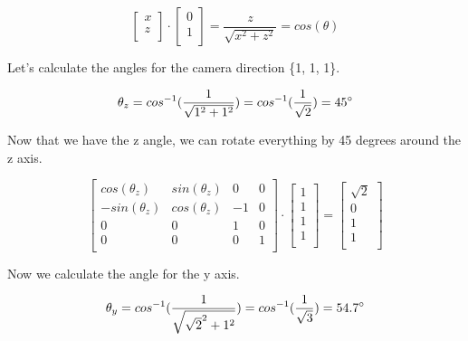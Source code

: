 \documentclass[12pt]{report} \usepackage{preamble}
\begin{document}
\[
	\begin{bmatrix}
		x \\
		z \\
	\end{bmatrix}
	\cdot
	\begin{bmatrix}
		0 \\
		1 \\
	\end{bmatrix}
	=
	\frac{z}{\sqrt{x^2 + z^2}}
	=
	cos(\theta)
\]

Let's calculate the angles for the camera direction \{1, 1, 1\}.

\[
	\theta_z = cos^{-1}(\frac{1}{\sqrt{1^2 + 1^2}})
	=
	cos^{-1}(\frac{1}{\sqrt{2}})
	=
	45\degree
\]

Now that we have the z angle, we can rotate everything by 45 degrees around the z axis.

\[
	\begin{bmatrix}
		cos(\theta_z)  & sin(\theta_z) & 0  & 0 \\
		-sin(\theta_z) & cos(\theta_z) & -1 & 0 \\
		0              & 0             & 1  & 0 \\
		0              & 0             & 0  & 1 \\
	\end{bmatrix}
	\cdot
	\begin{bmatrix}
		1 \\
		1 \\
		1 \\
		1 \\
	\end{bmatrix}
	=
	\begin{bmatrix}
		\sqrt{2} \\
		0        \\
		1        \\
		1        \\
	\end{bmatrix}
\]

Now we calculate the angle for the y axis.

\[
	\theta_y = cos^{-1}(\frac{1}{\sqrt{\sqrt{2}^2 + 1^2}})
	=
	cos^{-1}(\frac{1}{\sqrt{3}})
	=
	54.7\degree
\]
\end{document}
